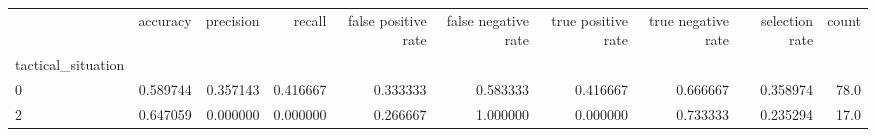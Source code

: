 \begin{tabular}{lrrrrrrrrr}
\toprule
{} &  accuracy &  precision &    recall &  false positive rate &  false negative rate &  true positive rate &  true negative rate &  selection rate &  count \\
tactical\_situation &           &            &           &                      &                      &                     &                     &                 &        \\
\midrule
0                  &  0.589744 &   0.357143 &  0.416667 &             0.333333 &             0.583333 &            0.416667 &            0.666667 &        0.358974 &   78.0 \\
2                  &  0.647059 &   0.000000 &  0.000000 &             0.266667 &             1.000000 &            0.000000 &            0.733333 &        0.235294 &   17.0 \\
\bottomrule
\end{tabular}
